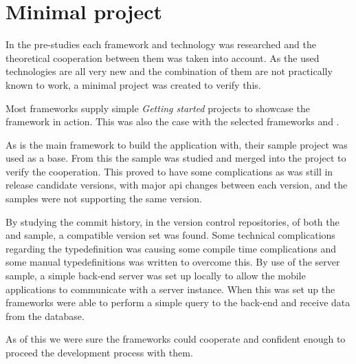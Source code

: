 \section{Minimal project}
In the pre-studies each framework and technology was researched and the theoretical cooperation between them was taken into account.
As the used technologies are all very new and the combination of them are not practically known to work, a minimal project was created to verify this.

Most frameworks supply simple \textit{Getting started} projects to showcase the framework in action.
This was also the case with the selected frameworks  \citep{minimalProject:sample:nativescript} and  \citep{minimalProject:sample:apollo}.

As  is the main framework to build the application with, their sample project was used as a base.
From this the  sample was studied and merged into the project to verify the cooperation.
This proved to have some complications as  was still in release candidate versions, with major \gls{api} changes between each version, and the samples were not supporting the same version.

By studying the commit history, in the  version control repositories, of both the  and  sample, a compatible version set was found.
Some technical complications regarding the \gls{typedefinition} was causing some compile time complications and some manual \glspl{typedefinition} was written to overcome this.
By use of the  server sample, a simple back-end server was set up locally to allow the mobile applications to communicate with a server instance.
When this was set up the frameworks were able to perform a simple query to the back-end and receive data from the database.

As of this we were sure the frameworks could cooperate and confident enough to proceed the development process with them.
